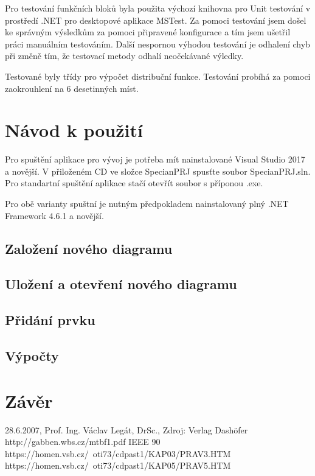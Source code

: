 \documentclass[FM,RP]{tulthesis}
\begin{document}
    Pro testování funkčních bloků byla použita výchozí knihovna pro Unit testování v prostředí .NET pro desktopové aplikace MSTest.
    Za pomoci testování jsem došel ke správným výsledkům za pomoci připravené konfigurace a tím jsem ušetřil práci manuálním testováním.
    Další nespornou výhodou testování je odhalení chyb při změně tím,  že testovací metody odhalí neočekávané výledky.

    Testované byly třídy pro výpočet distribuční funkce. Testování probíhá za pomoci zaokrouhlení na 6 desetinných míst.

\chapter{Návod k použití}

    Pro spuštění aplikace pro vývoj je potřeba mít nainstalované Visual Studio 2017 a novější. V přiloženém CD ve složce SpecianPRJ spusťte soubor SpecianPRJ.sln. 
    Pro standartní spuštění aplikace stačí otevřít soubor s příponou .exe.

    Pro obě varianty spuštní je nutným předpokladem nainstalovaný plný .NET Framework 4.6.1 a novější. 

    \section*{Založení nového diagramu}
    \section*{Uložení a otevření nového diagramu}
    \section*{Přidání prvku}
    \section*{Výpočty}

\chapter{Závěr}



\begin{thebibliography}{Mm99}
        28.6.2007, Prof. Ing. Václav Legát, DrSc., Zdroj: Verlag Dashöfer
        http://gabben.wbs.cz/mtbf1.pdf
        IEEE 90
        https://homen.vsb.cz/~oti73/cdpast1/KAP03/PRAV3.HTM
        https://homen.vsb.cz/~oti73/cdpast1/KAP05/PRAV5.HTM
\end{thebibliography}
\end{document}
